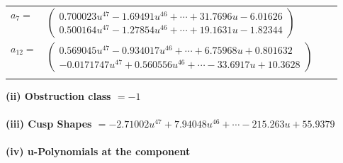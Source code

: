 \documentclass[1p]{elsarticle_modified}
\theoremstyle{definition}
\begin{document}
\begin{tabular}{m{7pt} m{180pt} m{7pt} m{180pt} }
\flushright $a_{7}=$&$\begin{pmatrix}0.700023 u^{47}-1.69491 u^{46}+\cdots+31.7696 u-6.01626\\0.500164 u^{47}-1.27854 u^{46}+\cdots+19.1631 u-1.82344\end{pmatrix}$ \\
\flushright $a_{12}=$&$\begin{pmatrix}0.569045 u^{47}-0.934017 u^{46}+\cdots+6.75968 u+0.801632\\-0.0171747 u^{47}+0.560556 u^{46}+\cdots-33.6917 u+10.3628\end{pmatrix}$\\&\end{tabular}
\flushleft \textbf{(ii) Obstruction class $= -1$}\\~\\
\flushleft \textbf{(iii) Cusp Shapes $= -2.71002 u^{47}+7.94048 u^{46}+\cdots-215.263 u+55.9379$}\\~\\
\newpage\renewcommand{\arraystretch}{1}
\flushleft \textbf{(iv) u-Polynomials at the component}\newline \\
\end{document}
